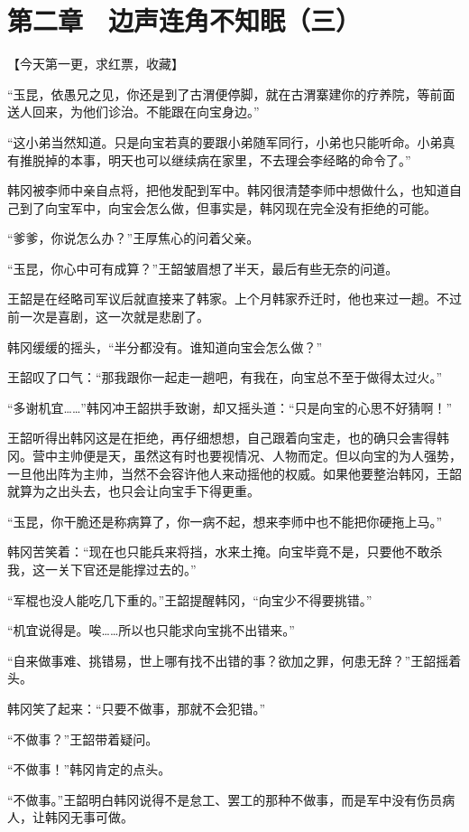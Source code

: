 \section{第二章　边声连角不知眠（三）}

【今天第一更，求红票，收藏】

“玉昆，依愚兄之见，你还是到了古渭便停脚，就在古渭寨建你的疗养院，等前面送人回来，为他们诊治。不能跟在向宝身边。”

“这小弟当然知道。只是向宝若真的要跟小弟随军同行，小弟也只能听命。小弟真有推脱掉的本事，明天也可以继续病在家里，不去理会李经略的命令了。”

韩冈被李师中亲自点将，把他发配到军中。韩冈很清楚李师中想做什么，也知道自己到了向宝军中，向宝会怎么做，但事实是，韩冈现在完全没有拒绝的可能。

“爹爹，你说怎么办？”王厚焦心的问着父亲。

“玉昆，你心中可有成算？”王韶皱眉想了半天，最后有些无奈的问道。

王韶是在经略司军议后就直接来了韩家。上个月韩家乔迁时，他也来过一趟。不过前一次是喜剧，这一次就是悲剧了。

韩冈缓缓的摇头，“半分都没有。谁知道向宝会怎么做？”

王韶叹了口气：“那我跟你一起走一趟吧，有我在，向宝总不至于做得太过火。”

“多谢机宜……”韩冈冲王韶拱手致谢，却又摇头道：“只是向宝的心思不好猜啊！”

王韶听得出韩冈这是在拒绝，再仔细想想，自己跟着向宝走，也的确只会害得韩冈。营中主帅便是天，虽然这有时也要视情况、人物而定。但以向宝的为人强势，一旦他出阵为主帅，当然不会容许他人来动摇他的权威。如果他要整治韩冈，王韶就算为之出头去，也只会让向宝手下得更重。

“玉昆，你干脆还是称病算了，你一病不起，想来李师中也不能把你硬拖上马。”

韩冈苦笑着：“现在也只能兵来将挡，水来土掩。向宝毕竟不是，只要他不敢杀我，这一关下官还是能撑过去的。”

“军棍也没人能吃几下重的。”王韶提醒韩冈，“向宝少不得要挑错。”

“机宜说得是。唉……所以也只能求向宝挑不出错来。”

“自来做事难、挑错易，世上哪有找不出错的事？欲加之罪，何患无辞？”王韶摇着头。

韩冈笑了起来：“只要不做事，那就不会犯错。”

“不做事？”王韶带着疑问。

“不做事！”韩冈肯定的点头。

“不做事。”王韶明白韩冈说得不是怠工、罢工的那种不做事，而是军中没有伤员病人，让韩冈无事可做。

